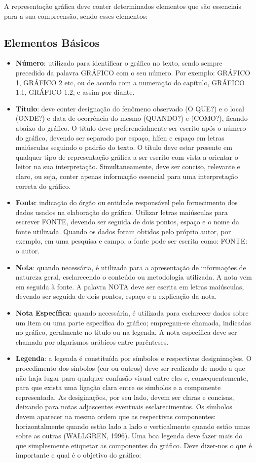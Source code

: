 A representação gráfica deve conter determinados elementos que são essenciais para a sua compreensão, sendo esses elementos:

\subsection{Elementos Básicos}

\begin{itemize}
\item \textbf{Número}: utilizado para identificar o gráfico no texto, sendo sempre precedido da palavra GRÁFICO com o seu número. Por exemplo: GRÁFICO 1, GRÁFICO 2 etc, ou de acordo com a numeração do capítulo, GRÁFICO 1.1, GRÁFICO 1.2, e assim por diante. \item \textbf{Título}: deve conter designação do fenômeno observado (O QUE?) e o local (ONDE?) e data de ocorrência do mesmo (QUANDO?) e (COMO?), ficando abaixo do gráfico. O título deve preferencialmente ser escrito após o número do gráfico, devendo ser separado por espaço, hífen e espaço em letras maiúsculas seguindo 
o padrão do texto. O título deve estar presente em qualquer tipo de representação gráfica a ser escrito com vista a orientar o leitor na sua interpretação. Simultaneamente, deve ser conciso, relevante e claro, ou seja, conter apenas informação essencial para uma interpretação correta do gráfico. 
\item \textbf{Fonte}: indicação do órgão ou entidade responsável pelo fornecimento dos dados usados na elaboração do gráfico. Utilizar letras maiúsculas para escrever FONTE, devendo ser seguida de dois pontos, espaço e o nome da fonte utilizada. Quando os dados foram obtidos pelo próprio autor, por exemplo, em uma pesquisa e campo, a fonte pode ser escrita como: FONTE: o autor. 
\item \textbf{Nota}: quando necessária, é utilizada para a apresentação de informações de natureza geral, esclarecendo o conteúdo ou metodologia utilizada. A nota vem em seguida à fonte. A palavra NOTA deve ser escrita em letras maiúsculas, devendo ser seguida de dois pontos, espaço e a explicação da nota. 
\item \textbf{Nota Específica}: quando necessária, é utilizada para esclarecer dados sobre um item ou uma parte específica do gráfico; empregam-se chamada, indicadas no gráfico, geralmente no titulo ou na legenda. A nota específica deve ser chamada por algarismos arábicos entre parênteses.
\item \textbf{Legenda}: a legenda é constituída por símbolos e respectivas designinações. O procedimento dos sinbolos (cor ou outros) deve ser realizado de modo a que não haja lugar para qualquer confusão visual entre eles e, consequentemente, para que exista uma ligação clara entre os simbolos e a componente representada. As desiginações, por seu lado, devem ser claras e concisas, deixando para notas adjascentes eventuais esclarecimentos. Os símbolos devem aparecer na mesma ordem que as respectivas componentes: horizontalmente quando estão lado a lado e verticalmente quando estão umas sobre as outras (WALLGREN, 1996). Uma boa legenda deve fazer mais do que simplesmente etiquetar as componentes do gráfico. Deve dizer-nos o que é importante e qual é o objetivo do gráfico:   

\end{itemize}
